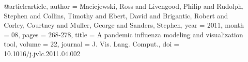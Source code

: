 @article{article,
author = {Maciejewski, Ross and Livengood, Philip and Rudolph, Stephen and Collins, Timothy and Ebert, David and Brigantic, Robert and Corley, Courtney and Muller, George and Sanders, Stephen},
year = {2011},
month = {08},
pages = {268-278},
title = {A pandemic influenza modeling and visualization tool},
volume = {22},
journal = {J. Vis. Lang. Comput.},
doi = {10.1016/j.jvlc.2011.04.002}
}